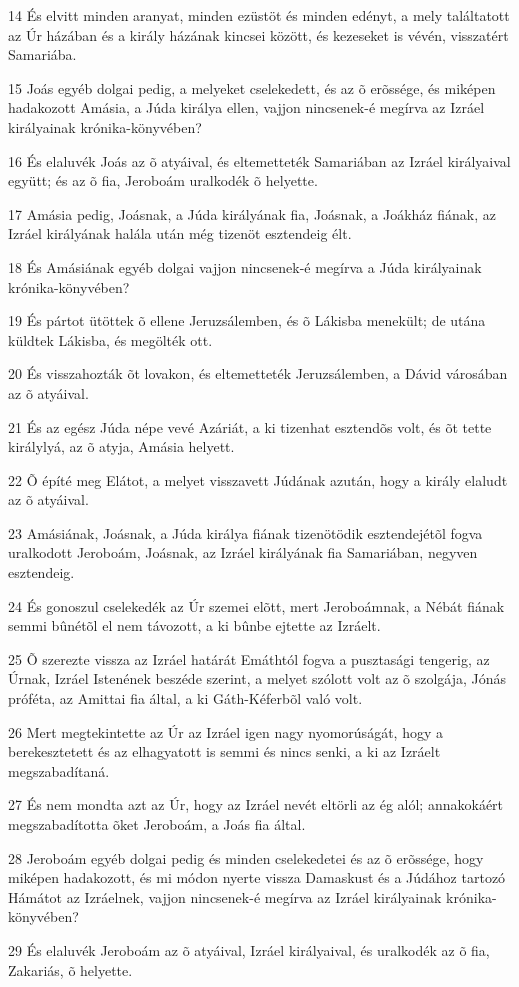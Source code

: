 \par 14 És elvitt minden aranyat, minden ezüstöt és minden edényt, a mely találtatott az Úr házában és a király házának kincsei között, és kezeseket is vévén, visszatért Samariába.
\par 15 Joás egyéb dolgai pedig, a melyeket cselekedett, és az õ erõssége, és miképen hadakozott Amásia, a Júda királya ellen, vajjon nincsenek-é megírva az Izráel királyainak krónika-könyvében?
\par 16 És elaluvék Joás az õ atyáival, és eltemetteték Samariában az Izráel királyaival együtt; és az õ fia, Jeroboám uralkodék õ helyette.
\par 17 Amásia pedig, Joásnak, a Júda királyának fia, Joásnak, a Joákház fiának, az Izráel királyának halála után még tizenöt esztendeig élt.
\par 18 És Amásiának egyéb dolgai vajjon nincsenek-é megírva a Júda királyainak krónika-könyvében?
\par 19 És pártot ütöttek õ ellene Jeruzsálemben, és õ Lákisba menekült; de utána küldtek Lákisba, és megölték ott.
\par 20 És visszahozták õt lovakon, és eltemetteték Jeruzsálemben, a Dávid városában az õ atyáival.
\par 21 És az egész Júda népe vevé Azáriát, a ki tizenhat esztendõs volt, és õt tette királylyá, az õ atyja, Amásia helyett.
\par 22 Õ építé meg Elátot, a melyet visszavett Júdának azután, hogy a király elaludt az õ atyáival.
\par 23 Amásiának, Joásnak, a Júda királya fiának tizenötödik esztendejétõl fogva uralkodott Jeroboám, Joásnak, az Izráel királyának fia Samariában, negyven esztendeig.
\par 24 És gonoszul cselekedék az Úr szemei elõtt, mert Jeroboámnak, a Nébát fiának semmi bûnétõl el nem távozott, a ki bûnbe ejtette az Izráelt.
\par 25 Õ szerezte vissza az Izráel határát Emáthtól fogva a pusztasági tengerig, az Úrnak, Izráel Istenének beszéde szerint, a melyet szólott volt az õ szolgája, Jónás próféta, az Amittai fia által, a ki Gáth-Kéferbõl való volt.
\par 26 Mert megtekintette az Úr az Izráel igen nagy nyomorúságát, hogy a berekesztetett és az elhagyatott is semmi és nincs senki, a ki az Izráelt megszabadítaná.
\par 27 És nem mondta azt az Úr, hogy az Izráel nevét eltörli az ég alól; annakokáért megszabadította õket Jeroboám, a Joás fia által.
\par 28 Jeroboám egyéb dolgai pedig és minden cselekedetei és az õ erõssége, hogy miképen hadakozott, és mi módon nyerte vissza Damaskust és a Júdához tartozó Hámátot az Izráelnek, vajjon nincsenek-é megírva az Izráel királyainak krónika-könyvében?
\par 29 És elaluvék Jeroboám az õ atyáival, Izráel királyaival, és uralkodék az õ fia, Zakariás, õ helyette.

